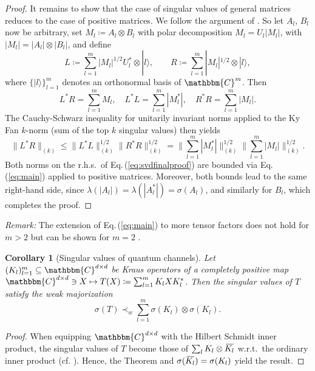 \documentclass[12pt,reqno]{amsart}
\newtheorem*{corollary*}{Corollary}
\newcommand{\C}{\mathbbm{C}}
\newcommand{\1}{\mathbbm{1}}
\newcommand{\overbar}[1]{\mkern3mu\overline{\mkern-3mu#1\mkern-1.5mu}\mkern1.5mu} %
\begin{document}
\begin{proof}
    It remains to show that the case of singular values of general matrices reduces to the case of positive matrices. We follow the argument of \cite[Lem.\,1]{RicoWolf}. So let $A_l$, $B_l$ now be arbitrary, set $M_l\coloneqq A_l\otimes B_l$ with polar decomposition $M_l=U_l|M_l|$, with $|M_l|=|A_l|\otimes |B_l|$, and define $$L\coloneqq\sum_{l=1}^m |M_l|^{1/2} U_l^*\otimes| l\rangle ,\qquad R\coloneq\sum_{l=1}^m |M_l|^{1/2}\otimes| l\rangle,$$
    where $\{|l\rangle\}_{l=1}^{m}$ denotes an orthonormal basis of $\C^m$. Then 
    $$L^*R=\sum_{l=1}^m M_l,\quad L^*L=\sum_{l=1}^m|M_l^*|,\quad R^*R=\sum_{l=1}^m|M_l|.$$
    The Cauchy-Schwarz inequality for unitarily invariant norms \cite[IX.5]{Bhatia} applied to the Ky Fan $k$-norm (sum of the top $k$ singular values) then yields
    \begin{equation}
\label{eq:svdfinalproof}\big\|L^*R\big\|_{(k)}\leq\big\|L^*L\big\|_{(k)}^{1/2}\big\|R^*R\big\|_{(k)}^{1/2}=\Big\|\sum_{l=1}^m |M_l^*|\Big\|_{(k)}^{1/2} \Big\|\sum_{l=1}^m |M_l|\Big\|_{(k)}^{1/2}.
    \end{equation}
Both norms on the r.h.s.\ of Eq.\,(\ref{eq:svdfinalproof}) are bounded via Eq.\,(\ref{eq:main}) applied to positive matrices. Moreover, both bounds lead to the same right-hand side, since $\lambda(|A_l|)=\lambda(|A_l^*|)=\sigma(A_l)$, and similarly for $B_l$, which completes the proof.
\end{proof}
\emph{Remark:} The extension of Eq.\,(\ref{eq:main}) to more tensor factors does not hold for $m>2$ \cite{Alhejji2026} but can be shown for $m=2$ \cite{Alhejji2026, Guterman}.
\begin{corollary*}[Singular values of quantum channels] Let $(K_l)_{l=1}^m\subseteq \C^{d\times d}$ be Kraus operators of a completely positive map $\C^{d\times d}\ni X\mapsto T(X)\coloneqq\sum_{l=1}^m K_l X K_l^*$. Then the singular values of $T$ satisfy the weak majorization
\begin{equation}
   \sigma(T)\prec_w \sum_{l=1}^m\sigma(K_l)\otimes\sigma(K_l)\Big. 
\end{equation}
    
\end{corollary*}
\begin{proof}
    When equipping $\C^{d\times d}$ with the Hilbert Schmidt inner product, the singular values of $T$ become those of $\sum_l  K_l\otimes \overbar{K_l}$ w.r.t.\ the ordinary inner product (cf. \cite[Eq.\,(4)]{Wolf2008}). Hence, the Theorem and $\sigma(\overbar{K_l})=\sigma(K_l)$ yield the result. 
\end{proof}





%
%

\appendix






{}\vspace*{15pt}
\end{document}
